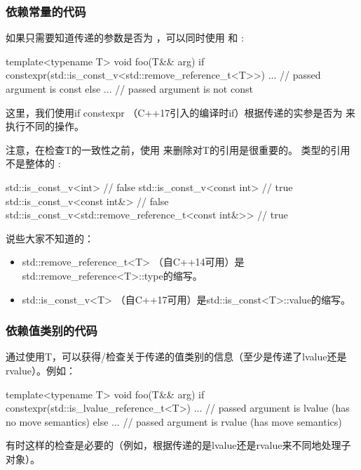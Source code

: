 \subsubsection{依赖常量的代码}

如果只需要知道传递的参数是否为 ，可以同时使用  和 :

\begin{cppcode}
template<typename T>
void foo(T&& arg)
{
	if constexpr(std::is_const_v<std::remove_reference_t<T>>) {
		... // passed argument is const
	}
	else {
		... // passed argument is not const
	}
}
\end{cppcode}

这里，我们使用if constexpr （C++17引入的编译时if）根据传递的实参是否为  来执行不同的操作。

注意，在检查T的一致性之前，使用  来删除对T的引用是很重要的。 类型的引用不是整体的 :

\begin{cppcode}
std::is_const_v<int> // false
std::is_const_v<const int> // true
std::is_const_v<const int&> // false
std::is_const_v<std::remove_reference_t<const int&>> // true
\end{cppcode}

说些大家不知道的：

\begin{itemize}
	\item std::remove_reference_t<T> （自C++14可用）是std::remove_reference<T>::type的缩写。
	\item std::is_const_v<T> （自C++17可用）是std::is_const<T>::value的缩写。
\end{itemize}

\subsubsection{依赖值类别的代码}

通过使用T，可以获得/检查关于传递的值类别的信息（至少是传递了lvalue还是rvalue）。例如：

\begin{cppcode}
template<typename T>
void foo(T&& arg)
{
	if constexpr(std::is_lvalue_reference_t<T>) {
		... // passed argument is lvalue (has no move semantics)
	}
	else {
		... // passed argument is rvalue (has move semantics)
	}
}
\end{cppcode}

有时这样的检查是必要的（例如，根据传递的是lvalue还是rvalue来不同地处理子对象）。

